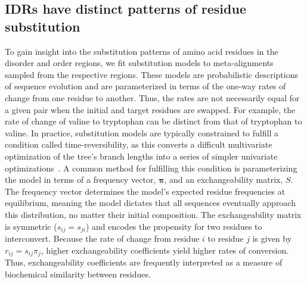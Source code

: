 \subsection{IDRs have distinct patterns of residue substitution}
To gain insight into the substitution patterns of amino acid residues in the disorder and order regions, we fit substitution models to meta-alignments sampled from the respective regions. These models are probabilistic descriptions of sequence evolution and are parameterized in terms of the one-way rates of change from one residue to another. Thus, the rates are not necessarily equal for a given pair when the initial and target residues are swapped. For example, the rate of change of valine to tryptophan can be distinct from that of tryptophan to valine. In practice, substitution models are typically constrained to fulfill a condition called time-reversibility, as this converts a difficult multivariate optimization of the tree's branch lengths into a series of simpler univariate optimizations~\cite{Felsenstein1981}. A common method for fulfilling this condition is parameterizing the model in terms of a frequency vector, $\boldsymbol \pi$, and an exchangeability matrix, $S$. The frequency vector determines the model's expected residue frequencies at equilibrium, meaning the model dictates that all sequences eventually approach this distribution, no matter their initial composition. The exchangeability matrix is symmetric ($s_{ij} = s_{ji}$) and encodes the propensity for two residues to interconvert. Because the rate of change from residue $i$ to residue $j$ is given by $r_{ij} = s_{ij}\pi_{j}$, higher exchangeability coefficients yield higher rates of conversion. Thus, exchangeability coefficients are frequently interpreted as a measure of biochemical similarity between residues.

